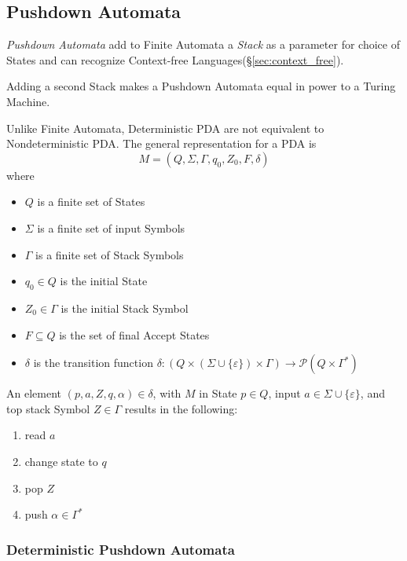 \subsection{Pushdown Automata}\label{sec:pushdown_automata}

\emph{Pushdown Automata} add to Finite Automata a \emph{Stack} as a
parameter for choice of States and can recognize Context-free
Languages(\S\ref{sec:context_free}).

Adding a second Stack makes a Pushdown Automata equal in power to a
Turing Machine.

Unlike Finite Automata, Deterministic PDA are not equivalent to
Nondeterministic PDA. The general representation for a PDA is
\[
    M = (Q, \Sigma, \Gamma, q_0, Z_0, F, \delta)
\]
where
\begin{itemize}
\item $Q$ is a finite set of States
\item $\Sigma$ is a finite set of input Symbols
\item $\Gamma$ is a finite set of Stack Symbols
\item $q_0 \in Q$ is the initial State
\item $Z_0 \in \Gamma$ is the initial Stack Symbol
\item $F \subseteq Q$ is the set of final Accept States
\item $\delta$ is the transition function $\delta: (Q \times (\Sigma
  \cup \{\varepsilon\}) \times \Gamma) \rightarrow \mathcal{P}(Q \times
  \Gamma^*)$
\end{itemize}

An element $(p,a,Z,q,\alpha)\in\delta$, with $M$ in State $p \in Q$,
input $a \in \Sigma \cup \{\varepsilon\}$, and top stack Symbol $Z \in
\Gamma$ results in the following:
\begin{enumerate}
\item read $a$
\item change state to $q$
\item pop $Z$
\item push $\alpha \in \Gamma^*$
\end{enumerate}



\subsubsection{Deterministic Pushdown Automata}\label{sec:deterministic_pda}

